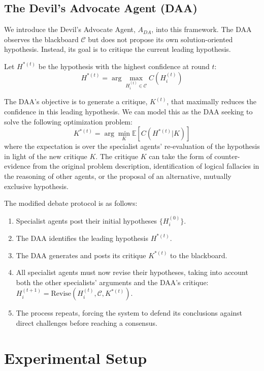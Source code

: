 \documentclass{article}
\begin{document}
\subsection{The Devil's Advocate Agent (DAA)}

We introduce the Devil's Advocate Agent, $A_{DA}$, into this framework. The DAA observes the blackboard $\mathcal{C}$ but does not propose its own solution-oriented hypothesis. Instead, its goal is to critique the current leading hypothesis.

Let $H^{*(t)}$ be the hypothesis with the highest confidence at round $t$:
\begin{equation}
    H^{*(t)} = \arg\max_{H_i^{(t)} \in \mathcal{C}} C(H_i^{(t)})
\end{equation}

The DAA's objective is to generate a critique, $K^{(t)}$, that maximally reduces the confidence in this leading hypothesis. We can model this as the DAA seeking to solve the following optimization problem:
\begin{equation}
    K^{*(t)} = \arg\min_{K} \mathbb{E}[C(H^{*(t)} | K)]
\end{equation}
where the expectation is over the specialist agents' re-evaluation of the hypothesis in light of the new critique $K$. The critique $K$ can take the form of counter-evidence from the original problem description, identification of logical fallacies in the reasoning of other agents, or the proposal of an alternative, mutually exclusive hypothesis.

The modified debate protocol is as follows:
\begin{enumerate}
    \item Specialist agents post their initial hypotheses $\{H_i^{(0)}\}$.
    \item The DAA identifies the leading hypothesis $H^{*(t)}$.
    \item The DAA generates and posts its critique $K^{*(t)}$ to the blackboard.
    \item All specialist agents must now revise their hypotheses, taking into account both the other specialists' arguments and the DAA's critique: $H_i^{(t+1)} = \text{Revise}(H_i^{(t)}, \mathcal{C}, K^{*(t)})$.
    \item The process repeats, forcing the system to defend its conclusions against direct challenges before reaching a consensus.
\end{enumerate}

\section{Experimental Setup}
\end{document}
